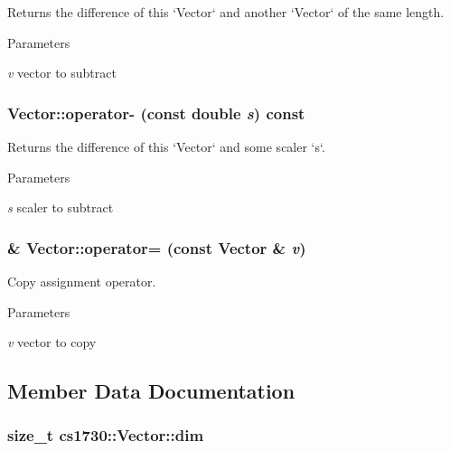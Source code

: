 Returns the difference of this `Vector` and another `Vector` of the same length. 
\begin{DoxyParams}{Parameters}
\item[{\em v}]vector to subtract \end{DoxyParams}
\hypertarget{classcs1730_1_1Vector_a0f9928e0ee1dd9efaafd43a020dff3e8}{
\subsubsection[{operator-\/}]{ Vector::operator-\/ (const double {\em s}) const}}
\label{classcs1730_1_1Vector_a0f9928e0ee1dd9efaafd43a020dff3e8}


Returns the difference of this `Vector` and some scaler `s`. 
\begin{DoxyParams}{Parameters}
\item[{\em s}]scaler to subtract \end{DoxyParams}
\hypertarget{classcs1730_1_1Vector_ae48c467a9f65d60e2f7455aba4ca1239}{
\subsubsection[{operator=}]{ \& Vector::operator= (const {\bf Vector} \& {\em v})}}
\label{classcs1730_1_1Vector_ae48c467a9f65d60e2f7455aba4ca1239}


Copy assignment operator. 
\begin{DoxyParams}{Parameters}
\item[{\em v}]vector to copy \end{DoxyParams}


\subsection{Member Data Documentation}
\hypertarget{classcs1730_1_1Vector_a23747645c422e9fd5130a685d254ff09}{
\subsubsection[{dim}]{\setlength{\rightskip}{0pt plus 5cm}size\_\-t {\bf cs1730::Vector::dim}}}
\label{classcs1730_1_1Vector_a23747645c422e9fd5130a685d254ff09}


